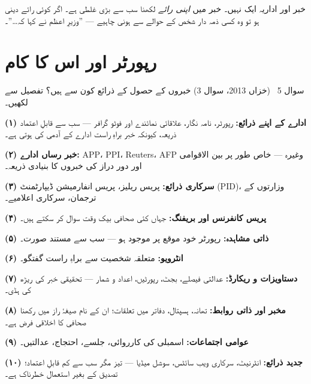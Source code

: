 \begin{ghalti}
خبر اور اداریہ ایک نہیں۔ خبر میں \emph{اپنی رائے} لکھنا سب سے بڑی غلطی ہے۔
اگر کوئی رائے دینی ہو تو وہ کسی ذمہ دار شخص کے حوالے سے ہونی چاہیے ---
''وزیرِ اعظم نے کہا کہ\ldots''۔
\end{ghalti}

\section*{رپورٹر اور اس کا کام}

\begin{sawal}{سوال \textenglish{5} \ \textnormal{\small(خزاں \textenglish{2013}، سوال \textenglish{3})}}
خبروں کے حصول کے ذرائع کون سے ہیں؟ تفصیل سے لکھیں۔
\end{sawal}

\begin{hal}
\textbf{(۱) ادارے کے اپنے ذرائع:} رپورٹر، نامہ نگار، علاقائی نمائندے اور
فوٹو گرافر --- سب سے قابلِ اعتماد ذریعہ، کیونکہ خبر براہِ راست ادارے کے آدمی
کی ہوتی ہے۔

\textbf{(۲) خبر رساں ادارے:} \textenglish{APP}، \textenglish{PPI}،
\textenglish{Reuters}، \textenglish{AFP} وغیرہ --- خاص طور پر بین الاقوامی اور
دور دراز کی خبروں کا بنیادی ذریعہ۔

\textbf{(۳) سرکاری ذرائع:} پریس ریلیز، پریس انفارمیشن ڈیپارٹمنٹ
(\textenglish{PID})، وزارتوں کے ترجمان، سرکاری اعلامیے۔

\textbf{(۴) پریس کانفرنس اور بریفنگ:} جہاں کئی صحافی بیک وقت سوال کر سکتے ہیں۔

\textbf{(۵) ذاتی مشاہدہ:} رپورٹر خود موقع پر موجود ہو --- سب سے مستند صورت۔

\textbf{(۶) انٹرویو:} متعلقہ شخصیت سے براہِ راست گفتگو۔

\textbf{(۷) دستاویزات و ریکارڈ:} عدالتی فیصلے، بجٹ، رپورٹیں، اعداد و شمار ---
تحقیقی خبر کی ریڑھ کی ہڈی۔

\textbf{(۸) مخبر اور ذاتی روابط:} تھانہ، ہسپتال، دفاتر میں تعلقات؛ ان کے نام
صیغۂ راز میں رکھنا صحافی کا اخلاقی فرض ہے۔

\textbf{(۹) عوامی اجتماعات:} اسمبلی کی کارروائی، جلسے، احتجاج، عدالتیں۔

\textbf{(۱۰) جدید ذرائع:} انٹرنیٹ، سرکاری ویب سائٹس، سوشل میڈیا --- تیز مگر
سب سے کم قابلِ اعتماد؛ تصدیق کے بغیر استعمال خطرناک ہے۔

\end{hal}

